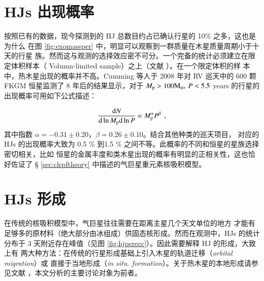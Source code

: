 \section{HJs 出现概率}  \label{sec:hjoccurate}

按照已有的数据，现今探测到的 HJ 总数目约占已确认行星的 10\% 之多，这也是为什么
在图 \ref{fig:exomassper} 中，明显可以观察到一群质量在木星质量周期小于十天的行星
族。然而这与观测的选择效应密不可分。一个完备的统计必须建立在限定体积样本（
Volumn-limited sample）之上（文献 ）。在一个限定体积的样
本中，热木星出现的概率并不高。Cumming 等人于 2008 年对 RV 巡天中的 600 颗 FKGM 
恒星监测了 8 年后的结果显示\cite{Cumming2008}，对于 $M_\mathrm{p} > 100 \mathrm{M}_\oplus,\, 
P<5.5$ years 的行星的出现概率可用如下公式描述：

\begin{equation} \label{eq:pltoccurate}
\frac{\mathrm{d} N}{\mathrm{d}\ln M_\mathrm{p} \mathrm{d}\ln P} \propto  M_\mathrm{p}^\alpha P^\beta \ \, ,
\end{equation} %
其中指数 $\alpha = -0.31 \pm 0.20 $，$\beta = 0.26 \pm 0.10$。结合其他种类的巡天项目，
对应的 HJs 的出现概率大致为 0.5 \% 到1.5 \% 之间不等\cite{Howard2012,Marcy2005,
Mayor2011,Wright2012}。此概率的不同和恒星的星族选择密切相关\cite{Wright2012}，比如
恒星的金属丰度和类木星出现的概率有明显的正相关性\cite{Gonzalez1997,Santos2001,
Santos2004,Fischer2005,Udry2007,Sozzetti2009,Sousa2011}，这也恰好佐证了 \S 
\ref{sec:clspftheory} 中描述的气巨星重元素核吸积模型。


\section{HJs 形成} \label{sec:hjform}


在传统的核吸积模型中\cite{IdaLin2004b}，气巨星往往需要在距离主星几个天文单位的地方
才能有足够多的原材料（绝大部分由冰组成）供固态核形成。然而在观测中，HJs 的统计
分布于 3 天附近存在峰值（见图 \ref{fig:hjperecc}）。因此需要解释 HJ 的形成，大致上有
两大种方法：在传统的行星形成基础上引入木星的轨道迁移（\textit{orbital migration}）或
直接于当地形成（\textit{in situ. formation}）。关于热木星的本地形成请参见文献 
，本文分析的主要讨论对象为前者。


